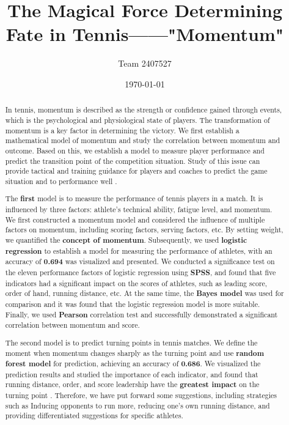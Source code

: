 \documentclass{mcmthesis}  %
\title{The Magical Force Determining Fate in Tennis------"Momentum"}  %
\author{\small Team 2407527}  %
\date{\today}  %
\begin{document}
\thispagestyle{empty}
\begin{abstract}  %
\par In tennis, momentum is described as the strength or confidence gained through events, which is the psychological and physiological state of players. The transformation of momentum is a key factor in determining the victory. We first establish a mathematical model of momentum and study the correlation between momentum and outcome. Based on this, we establish a model to measure player performance and predict the transition point of the competition situation. Study of this issue can provide tactical and training guidance for players and coaches to predict the game situation and to performance well .

\par The \textbf{first} model is to measure the performance of tennis players in a match. It is influenced by three factors: athlete's technical ability, fatigue level, and momentum. We first constructed a momentum model and considered the influence of multiple factors on momentum, including scoring factors, serving factors,  etc. By setting weight, we quantified the \textbf{concept of momentum}. Subsequently, we used \textbf{logistic regression} to establish a model for measuring the performance of athletes, with an accuracy of \textbf{0.694} was visualized and presented. We conducted a significance test on the eleven performance factors of logistic regression using \textbf{SPSS}, and found that five indicators had a significant impact on the scores of athletes, such as leading score, order of hand, running distance, etc. At the same time, the \textbf{Bayes model} was used for comparison and it was found that the logistic regression model is more suitable. Finally, we used \textbf{Pearson} correlation test and successfully demonstrated a significant correlation between momentum and score.

\par The second model is to predict turning points in tennis matches. We define the moment when momentum changes sharply as the turning point and use \textbf{random forest model} for prediction, achieving an accuracy of \textbf{0.686}. We visualized the prediction results and studied the importance of each indicator, and found that running distance, order, and score leadership have the \textbf{greatest impact} on the turning point . Therefore, we have put forward some suggestions, including strategies such as Inducing opponents to run more, reducing one's own running distance, and providing differentiated suggestions for specific athletes.


\end{abstract}
\end{document}
